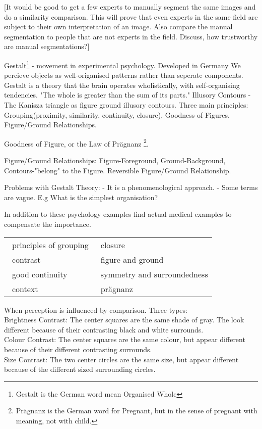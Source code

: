 [It would be good to get a few experts to manually segment the same images and do a similarity comparison. This will prove that even experts in the same field are subject to their own interpretation of an image. Also compare the manual segmentation to people that are not experts in the field. Discuss, how trustworthy are manual segmentations?]

Gestalt\footnote{Gestalt is the German word mean Organised Whole} - movement in experimental psychology. Developed in Germany We percieve objects as well-origanised patterns rather than seperate components. Gestalt is a theory that the brain operates wholistically, with self-organising tendencies. "The whole is greater than the sum of its parts." Illusory Contours - The Kanisza triangle as figure ground illusory contours. Three main principles: Grouping(proximity, similarity, continuity, closure), Goodness of Figures, Figure/Ground Relationships.

Goodness of Figure, or the Law of Pr\"{a}gnanz \footnote{Pr\"{a}gnanz is the German word for Pregnant, but in the sense of pregnant with meaning, not with child.}. 

Figure/Ground Relationships: Figure-Foreground, Ground-Background, Contours-"belong" to the Figure. Reversible Figure/Ground Relationship.

Problems with Gestalt Theory: 
- It is a phenomenological approach.
- Some terms are vague. E.g What is the simplest organisation?

In addition to these psychology examples find actual medical examples to compensate the importance.

\begin{table}[h!]
	\centering
	\begin{tabular}{ll}
		\textbullet\, principles of grouping 		& \textbullet\, closure \\ 
		\textbullet\, contrast 		& \textbullet\, figure and ground \\ 
		\textbullet\, good continuity 	& \textbullet\, symmetry and surroundedness \\ 
		\textbullet\, context 		& \textbullet\, pr\"{a}gnanz \\ 
	\end{tabular} 
\end{table}

\begin{definition}[Contrast]
	When perception is influenced by comparison. Three types:\\
	Brightness Contrast: The center squares are the same shade of gray. The look different because of their contrasting black and white surrounds.\\
	Colour Contrast: The center squares are the same colour, but appear different because of their different contrasting surrounds.\\
	Size Contrast: The two center circles are the same size, but appear different because of the different sized surrounding circles.
\end{definition}

